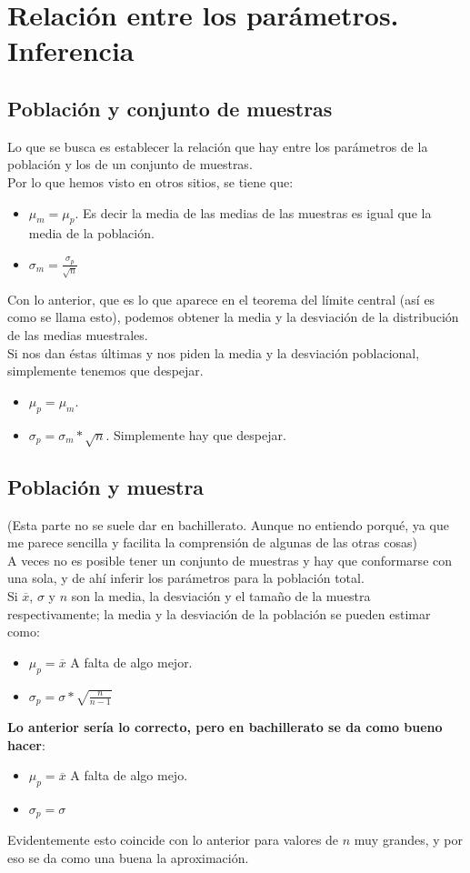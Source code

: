 \documentclass[a4paper,11pt,answers]{exam}
\begin{document}
\section*{Relación entre los parámetros. Inferencia}
\subsection*{Población y conjunto de muestras}
Lo que se busca es establecer la relación que hay entre los parámetros de la población y los de un conjunto de muestras.\\
Por lo que hemos visto en otros sitios, se tiene que:
\begin{itemize}
\Large
\item $\mu_m = \mu_p$. \normalsize Es decir la media de las medias de las muestras es igual que la media de la población.\Large
\item $\sigma_m = \frac{\sigma_p}{\sqrt{n}}$
\end{itemize}
Con lo anterior, que es lo que aparece en el teorema del límite central (así es como se llama esto), podemos obtener la media y la desviación de la distribución de las medias muestrales.\\
Si nos dan éstas últimas y nos piden la media y la desviación poblacional, simplemente tenemos que despejar.
\begin{itemize}
\item $\mu_p = \mu_m$.
\item $\sigma_p = \sigma_m * \sqrt{n}$. Simplemente hay que despejar.
\end{itemize}
\subsection*{Población y muestra}
(Esta parte no se suele dar en bachillerato. Aunque no entiendo porqué, ya que me parece sencilla y facilita la comprensión de algunas de las otras cosas)\\
A veces no es posible tener un conjunto de muestras y hay que conformarse con una sola, y de ahí inferir los parámetros para la población total.\\

Si $\overline{x}$, $\sigma$ y $n$ son la media, la desviación y el tamaño de la muestra respectivamente; la media y la desviación de la población se pueden estimar como:
\begin{itemize}
\Large
\item $\mu_p = \overline{x}$ \normalsize A falta de algo mejor.\Large
\item $\sigma_p = \sigma * \sqrt{\frac{n}{n-1}}$


\end{itemize}
\textbf{Lo anterior sería lo correcto, pero en bachillerato se da como bueno hacer}:
\begin{itemize}
\Large
\item $\mu_p = \overline{x}$ \normalsize A falta de algo mejo.\Large
\item $\sigma_p = \sigma$
\end{itemize}
Evidentemente esto coincide con lo anterior para valores de $n$ muy grandes, y por eso se da como una buena la aproximación.
\end{document}

